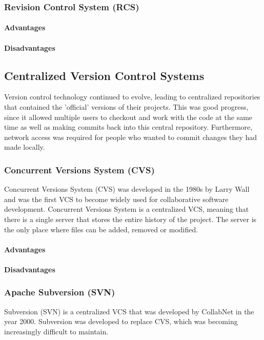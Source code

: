 \subsubsection{Revision Control System (RCS)}
\paragraph{Advantages}
\paragraph{Disadvantages}
\subsection{Centralized Version Control Systems}
Version control technology continued to evolve, leading to centralized repositories that contained the 'official' versions of their projects. This was good progress, since it allowed multiple users to checkout and work with the code at the same time as well as making commits back into this central repository. Furthermore, network access was required for people who wanted to commit changes they had made locally.
\subsubsection{Concurrent Versions System (CVS)}
Concurrent Versions System (CVS) was developed in the 1980s by Larry Wall and was the first VCS to become widely used for collaborative software development. Concurrent Versions System is a centralized VCS, meaning that there is a single server that stores the entire history of the project. The server is the only place where files can be added, removed or modified.
\paragraph{Advantages}
\paragraph{Disadvantages}
\subsubsection{Apache Subversion (SVN)}
Subversion (SVN) is a centralized VCS that was developed by CollabNet in the year 2000. Subversion was developed to replace CVS, which was becoming increasingly difficult to maintain.
